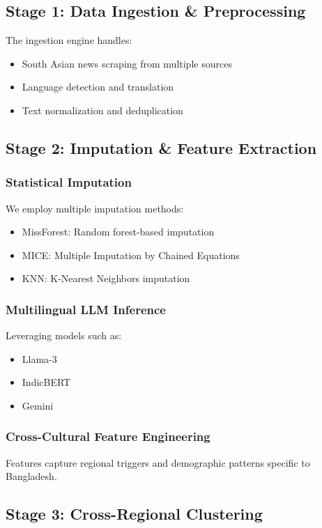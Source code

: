 \documentclass[12pt,a4paper]{article}
\begin{document}
\subsection{Stage 1: Data Ingestion \& Preprocessing}
The ingestion engine handles:
\begin{itemize}
    \item South Asian news scraping from multiple sources
    \item Language detection and translation
    \item Text normalization and deduplication
\end{itemize}

\subsection{Stage 2: Imputation \& Feature Extraction}
\subsubsection{Statistical Imputation}
We employ multiple imputation methods:
\begin{itemize}
    \item MissForest: Random forest-based imputation
    \item MICE: Multiple Imputation by Chained Equations
    \item KNN: K-Nearest Neighbors imputation
\end{itemize}

\subsubsection{Multilingual LLM Inference}
Leveraging models such as:
\begin{itemize}
    \item Llama-3
    \item IndicBERT
    \item Gemini
\end{itemize}

\subsubsection{Cross-Cultural Feature Engineering}
Features capture regional triggers and demographic patterns specific to Bangladesh.

\subsection{Stage 3: Cross-Regional Clustering}
\end{document}
